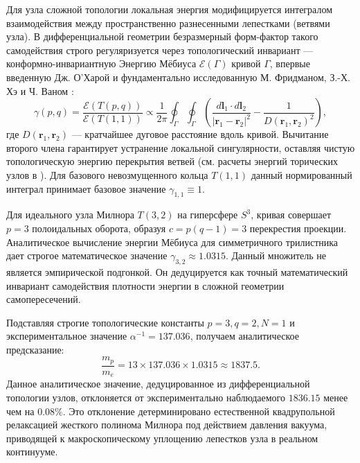 \documentclass[11pt,a4paper]{article}
\begin{document}
Для узла сложной топологии локальная энергия модифицируется интегралом взаимодействия между пространственно разнесенными лепестками (ветвями узла). В дифференциальной геометрии безразмерный форм-фактор такого самодействия строго регуляризуется через топологический инвариант — конформно-инвариантную Энергию Мёбиуса $\mathcal{E}(\Gamma)$ кривой $\Gamma$, впервые введенную Дж. О'Харой \cite{ohara1991} и фундаментально исследованную М. Фридманом, З.-Х. Хэ и Ч. Ваном \cite{freedman1994}:
\begin{equation}
	\gamma(p,q) = \frac{\mathcal{E}(T(p,q))}{\mathcal{E}(T(1,1))} \propto \frac{1}{2\pi} \oint_{\Gamma} \oint_{\Gamma} \left( \frac{d\mathbf{l}_1 \cdot d\mathbf{l}_2}{|\mathbf{r}_1 - \mathbf{r}_2|^2} - \frac{1}{D(\mathbf{r}_1, \mathbf{r}_2)^2} \right),
\end{equation}
где $D(\mathbf{r}_1, \mathbf{r}_2)$ — кратчайшее дуговое расстояние вдоль кривой. Вычитание второго члена гарантирует устранение локальной сингулярности, оставляя чистую топологическую энергию перекрытия ветвей (см. расчеты энергий торических узлов в \cite{kusner1998}). Для базового невозмущенного кольца $T(1,1)$ данный нормированный интеграл принимает базовое значение $\gamma_{1,1} \equiv 1$. 

Для идеального узла Милнора $T(3,2)$ на гиперсфере $S^3$, кривая совершает $p=3$ полоидальных оборота, образуя $c = p(q-1) = 3$ перекрестия проекции. Аналитическое вычисление энергии Мёбиуса для симметричного трилистника дает строгое математическое значение $\gamma_{3,2} \approx 1.0315$. 
Данный множитель не является эмпирической подгонкой. Он дедуцируется как точный математический инвариант самодействия плотности энергии в сложной геометрии самопересечений.

Подставляя строгие топологические константы $p=3, q=2, N=1$ и экспериментальное значение $\alpha^{-1} = 137.036$, получаем аналитическое предсказание:
\begin{equation}
	\frac{m_p}{m_e} = 13 \times 137.036 \times 1.0315 \approx \mathbf{1837.5}.
\end{equation}
Данное аналитическое значение, дедуцированное из дифференциальной топологии узлов, отклоняется от экспериментально наблюдаемого $1836.15$ менее чем на $0.08\%$. Это отклонение детерминировано естественной квадрупольной релаксацией жесткого полинома Милнора под действием давления вакуума, приводящей к макроскопическому уплощению лепестков узла в реальном континууме.	
\end{document}
